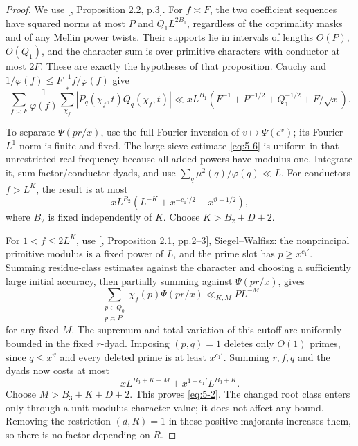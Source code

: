 \documentclass[11pt]{article}
\theoremstyle{definition}
\theoremstyle{definition}
\begin{document}
\begin{proof}
We use [, Proposition 2.2, p.3]. For \(f\asymp F\), the two coefficient sequences have squared norms at most \(P\) and \(Q_1L^{2B_1}\), regardless of the coprimality masks and of any Mellin power twists. Their supports lie in intervals of lengths \(O(P)\), \(O(Q_1)\), and the character sum is over primitive characters with conductor at most \(2F\). These are exactly the hypotheses of that proposition. Cauchy and \(1/\varphi(f)\le F^{-1}f/\varphi(f)\) give
\begin{equation}
\sum_{f\asymp F}\frac1{\varphi(f)}
 \sum_{\chi_f}^{*}|P_q(\chi_f,t)Q_q(\chi_f,t)|
 \ll xL^{B_1}
 \left(F^{-1}+P^{-1/2}+Q_1^{-1/2}+F/\sqrt x\right).
                                                        \tag{5.6}\label{eq:5-6}
\end{equation}

To separate \(\Psi(pr/x)\), use the full Fourier inversion of \(v\mapsto\Psi(e^v)\); its Fourier \(L^1\) norm is finite and fixed. The large-sieve estimate \eqref{eq:5-6} is uniform in that unrestricted real frequency because all added powers have modulus one. Integrate it, sum factor/conductor dyads, and use \(\sum_q\mu^2(q)/\varphi(q)\ll L\). For conductors \(f>L^K\), the result is at most
\begin{equation*}
xL^{B_2}(L^{-K}+x^{-c_1'/2}+x^{\vartheta-1/2}),
\end{equation*}
where \(B_2\) is fixed independently of \(K\). Choose \(K>B_2+D+2\).

For \(1<f\le2L^K\), use [, Proposition 2.1, pp.2--3], Siegel--Walfisz: the nonprincipal primitive modulus is a fixed power of \(L\), and the prime slot has \(p\ge x^{c_1'}\). Summing residue-class estimates against the character and choosing a sufficiently large initial accuracy, then partially summing against \(\Psi(pr/x)\), gives
\begin{equation*}
\sum_{\substack{p\in Q_0\\p\asymp P}}\chi_f(p)\Psi(pr/x)
 \ll_{K,M}PL^{-M}
\end{equation*}
for any fixed \(M\). The supremum and total variation of this cutoff are uniformly bounded in the fixed \(r\)-dyad. Imposing \((p,q)=1\) deletes only \(O(1)\) primes, since \(q\le x^\vartheta\) and every deleted prime is at least \(x^{c_1'}\). Summing \(r,f,q\) and the dyads now costs at most
\begin{equation*}
xL^{B_3+K-M}+x^{1-c_1'}L^{B_3+K}.
\end{equation*}
Choose \(M>B_3+K+D+2\). This proves \eqref{eq:5-2}. The changed root class enters only through a unit-modulus character value; it does not affect any bound. Removing the restriction \((d,R)=1\) in these positive majorants increases them, so there is no factor depending on \(R\). 

\end{proof}
\end{document}
